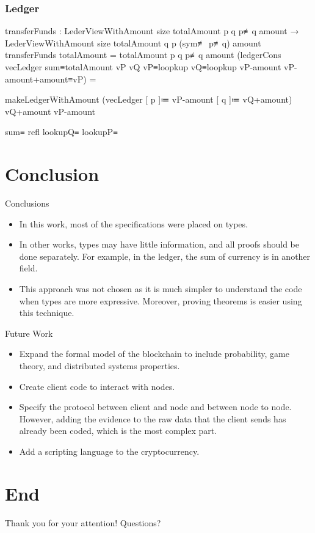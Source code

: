 \documentclass{beamer}
\begin{document}
\begin{frame}
  \frametitle{Ledger}
\begin{code}
transferFunds :
    LederViewWithAmount size totalAmount p q
      p≢q amount
  → LederViewWithAmount size totalAmount q p
      (sym≢ p≢q) amount
transferFunds {totalAmount = totalAmount} {p} {q}
  {p≢q} {amount}
  (ledgerCons vecLedger sum≡totalAmount vP vQ vP≡loopkup
    vQ≡loopkup vP-amount vP-amount+amount≡vP) =

    makeLedgerWithAmount
      (vecLedger [ p ]≔ vP-amount [ q ]≔ vQ+amount)
      vQ+amount vP-amount

      sum≡ refl lookupQ≡ lookupP≡
\end{code}
\end{frame}

\section{Conclusion}

\begin{frame}{Conclusions}
  \begin{itemize}[<+->]
    \item In this work, most of the specifications were placed on types.
    \item In other works, types may have little information, and all proofs should be done separately.
      For example, in the ledger, the sum of currency is in another field.
    \item This approach was not chosen as it is much simpler to understand the code when types are more expressive.
      Moreover, proving theorems is easier using this technique.
  \end{itemize}
\end{frame}

\begin{frame}{Future Work}
  \begin{itemize}[<+->]
    \item Expand the formal model of the blockchain to include
      probability, game theory, and distributed systems properties.
    \item Create client code to interact with nodes.
    \item Specify the protocol between client and node and between node to node.
          However, adding the evidence to the raw data that the client sends has already been coded,
          which is the most complex part.
    \item Add a scripting language to the cryptocurrency.
  \end{itemize}
\end{frame}

\section{End}

\begin{frame}
  \vspace*{36 pt}
  \begin{center}
  {\Huge Thank you for your attention!}
  {\Huge \newline}
  {\Huge Questions?}
  \end{center}
\end{frame}

%   
%   
\end{document}
